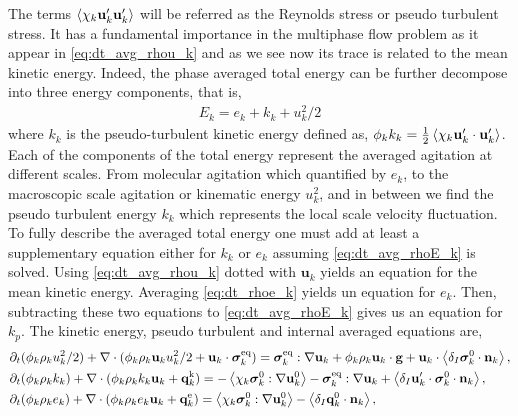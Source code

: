 The terms $\left<\chi_k \textbf{u}_k'\textbf{u}_k'\right>$ will be referred as the Reynolds stress or pseudo turbulent stress. 
It has a fundamental importance in the multiphase flow problem as it appear in \ref{eq:dt_avg_rhou_k} and as we see now its trace is related to the mean kinetic energy. 
Indeed, the phase averaged total energy can be further decompose into three energy components, that is,  
\begin{align}
    E_k = e_k + k_k + u_k^2/2
    \label{eq:E_def2}
\end{align}
where $k_k$ is the pseudo-turbulent kinetic energy defined as, $\phi_k k_k = \frac{1}{2}\left<\chi_k \textbf{u}_k'\cdot \textbf{u}_k'\right>$. 
Each of the components of the total energy represent the averaged agitation at different scales. 
From molecular agitation which quantified by $e_k$, to the macroscopic scale agitation or kinematic energy $u_k^2$, and in between we find the pseudo turbulent energy $k_k$ which represents the local scale velocity fluctuation. 
To fully describe the averaged total energy one must add at least a supplementary equation either for $k_k$ or $e_k$ assuming \ref{eq:dt_avg_rhoE_k} is solved. 
Using \ref{eq:dt_avg_rhou_k} dotted with $\textbf{u}_k$ yields an equation for the mean kinetic energy. 
Averaging \ref{eq:dt_rhoe_k} yields un equation for $e_k$.  
Then, subtracting these two equations to \ref{eq:dt_avg_rhoE_k} gives us an equation for $k_p$. 
The kinetic energy, pseudo turbulent and internal averaged equations are, 
\begin{align}
    \label{eq:dt_avg_uk2}
    &\partial_t (\phi_k \rho_ku_k^2/2)  
    + \mathbf{\nabla}\cdot (
        \phi_k \rho_k\textbf{u}_ku_k^2/2
        + \textbf{u}_k \cdot \bm{\sigma}_k^\text{eq}
    )
    = 
    \bm{\sigma}_k^\text{eq} : \mathbf{\nabla} \textbf{u}_k
    + \phi_k \rho_k \textbf{u}_k\cdot \textbf{g} 
    +  \textbf{u}_k\cdot \left<\delta_I \bm{\sigma}_k^0 \cdot \textbf{n}_k\right>,\\
    \label{eq:dt_avg_kk}
    &\partial_t (\phi_k\rho_kk_k)  
    + \mathbf{\nabla}\cdot (
        \phi_k\rho_kk_k\textbf{u}_k
        + \textbf{q}_k^\text{k} 
        )
    = 
    - \left<\chi_k\bm{\sigma}_k^0 : \mathbf{\nabla} \textbf{u}_k^0\right>
    - \bm{\sigma}_k^\text{eq} : \mathbf{\nabla} \textbf{u}_k
    + \left<\delta_I \textbf{u}_k' \cdot \bm{\sigma}_k^0 \cdot \textbf{n}_k\right>,\\
    \label{eq:dt_avg_ek}
    &\partial_t (\phi_k\rho_ke_k)  
    + \mathbf{\nabla}\cdot (
        \phi_k \rho_ke_k\textbf{u}_k
        +
        \textbf{q}_k^\text{e} 
        )
    = 
    \left<\chi_k\bm{\sigma}_k^0 : \mathbf{\nabla} \textbf{u}_k^0\right>
    - \left<\delta_I \textbf{q}_k^0 \cdot \textbf{n}_k\right>,
\end{align}
